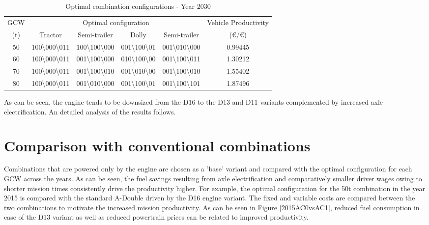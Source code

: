 \documentclass[ExampleMasters.tex]{subfiles}
\begin{document}
\begin{table}[ht]
\caption{Optimal combination configurations - Year 2030}
\centering
\begin{tabular}{c c c c c c}
\hline\hline
GCW & \multicolumn{4}{c}{Optimal configuration} & Vehicle Productivity \\ \cline{2-5}
(t) & Tractor & Semi-trailer & Dolly & Semi-trailer & (\euro/\euro)\\ 
\hline
50 & 100\textbackslash000\textbackslash011 & 100\textbackslash100\textbackslash000 & 001\textbackslash100\textbackslash01 & 001\textbackslash010\textbackslash000 & 0.99445 \\
60 & 100\textbackslash000\textbackslash011 & 001\textbackslash100\textbackslash000 & 010\textbackslash100\textbackslash00 & 001\textbackslash100\textbackslash011 & 1.30212 \\
70 & 100\textbackslash000\textbackslash011 & 001\textbackslash100\textbackslash010 & 001\textbackslash010\textbackslash00 & 001\textbackslash100\textbackslash010 & 1.55402 \\
80 & 100\textbackslash000\textbackslash011 & 001\textbackslash010\textbackslash000 & 001\textbackslash100\textbackslash01 & 001\textbackslash100\textbackslash101 & 1.87496 \\
\hline
\end{tabular}
\label{table:optComb2030}
\end{table}

As can be seen, the engine tends to be downsized from the D16 to the D13 and D11 variants complemented by increased axle electrification. An detailed analysis of the results follows.\\

\section{Comparison with conventional combinations}
Combinations that are powered only by the engine are chosen as a 'base' variant and compared with the optimal configuration for each GCW across the years. As can be seen, the fuel savings resulting from axle electrification and comparatively smaller driver wages owing to shorter mission times consistently drive the productivity higher. For example, the optimal configuration for the 50t combination in the year 2015 is compared with the standard A-Double driven by the D16 engine variant. The fixed and variable costs are compared between the two combinations to motivate the increased mission productivity. As can be seen in Figure \ref{2015AC0vsAC1}, reduced fuel consumption in case of the D13 variant as well as reduced powertrain prices can be related to improved productivity.\\
\end{document}
